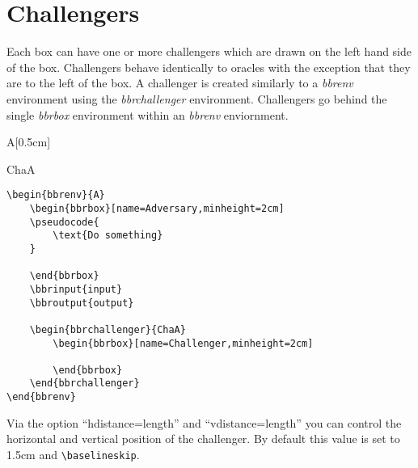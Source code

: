 \documentclass[a4paper]{report}
\begin{document}
\section{Challengers}
Each box can have one or more challengers which are drawn on the left hand side of the box. Challengers
behave identically to oracles with the exception that they are to the left of the box. A challenger
is created similarly to a \emph{bbrenv} environment using the \emph{bbrchallenger} environment. Challengers
go behind the single \emph{bbrbox} environment within an \emph{bbrenv} enviornment.

\begin{bbrenv}[1cm]{A}[0.5cm]
	\begin{bbrbox}[name=Adversary,minheight=2cm]

	\end{bbrbox}

	\begin{bbrchallenger}{ChaA}
		\begin{bbrbox}[name=Challenger,minheight=2cm]
		
		\end{bbrbox}
	\end{bbrchallenger}
\end{bbrenv}


\begin{lstlisting}
\begin{bbrenv}{A}
	\begin{bbrbox}[name=Adversary,minheight=2cm]
	\pseudocode{
		\text{Do something} 
	}

	\end{bbrbox}
	\bbrinput{input}
	\bbroutput{output}

	\begin{bbrchallenger}{ChaA}
		\begin{bbrbox}[name=Challenger,minheight=2cm]
		
		\end{bbrbox}
	\end{bbrchallenger}
\end{bbrenv}
\end{lstlisting}
Via the option \enquote{hdistance=length} and \enquote{vdistance=length} you can control the horizontal and vertical position of the challenger. By default this value is set to 1.5cm and \lstinline$\baselineskip$.
\end{document}
